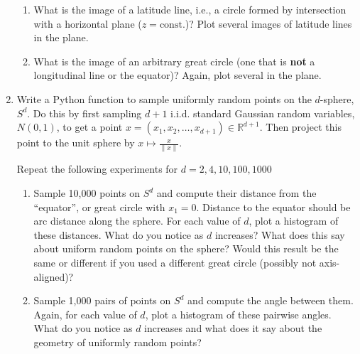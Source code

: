 \documentclass[11pt]{article}
\begin{document}
\begin{enumerate}
\begin{enumerate}
  \item What is the image of a latitude line, i.e., a circle formed by
    intersection with a horizontal plane ($z = \mathrm{const.}$)? Plot several
    images of latitude lines in the plane.

  \item What is the image of an arbitrary great circle (one that is {\bf not} a
    longitudinal line or the equator)? Again, plot several in the plane.
  \end{enumerate}

\item Write a Python function to sample uniformly random points on the
  $d$-sphere, $S^d$. Do this by first sampling $d+1$ i.i.d. standard Gaussian
  random variables, $N(0,1)$, to get a point
  $x = (x_1, x_2, \ldots, x_{d+1}) \in \mathbb{R}^{d+1}$. Then project this
  point to the unit sphere by $x \mapsto \frac{x}{\|x\|}$.

  Repeat the following experiments for $d = 2, 4, 10, 100, 1000$
  \begin{enumerate}
  \item Sample 10,000 points on $S^d$ and compute their distance from the
    ``equator'', or great circle with $x_1 = 0$. Distance to the equator should
    be arc distance along the sphere. For each value of $d$, plot a histogram of
    these distances. What do you notice as $d$ increases? What does this say
    about uniform random points on the sphere? Would this result be the same or
    different if you used a different great circle (possibly not axis-aligned)?

  \item Sample 1,000 pairs of points on $S^d$ and compute the angle between
    them. Again, for each value of $d$, plot a histogram of these pairwise
    angles. What do you notice as $d$ increases and what does it say about the
    geometry of uniformly random points?
  \end{enumerate}
  
\end{enumerate}
\end{document}
